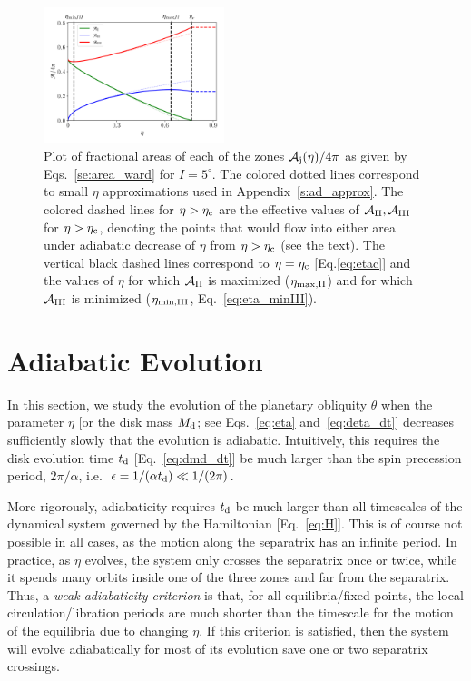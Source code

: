 \documentclass[twocolumn,twocolappendix]{aastex63}
\begin{document}
\begin{figure}
    \centering
    \includegraphics[width=0.47\textwidth]{plots_diskdisp/1_areas.png}
    \caption{Plot of fractional areas of each of the zones
    $\mathcal{A}_{\rm j}(\eta) / 4\pi$ as given by Eqs.~\eqref{se:area_ward}
    \textcolor{Corr}{for $I = 5^\circ$}. The colored dotted lines correspond to
    small $\eta$ approximations used in Appendix~\ref{s:ad_approx}. The colored
    dashed lines for $\eta > \eta_{\rm c}$ are the effective values of
    $\mathcal{A}_{\rm II}, \mathcal{A}_{\rm III}$ for $\eta > \eta_{\rm c}$,
    denoting the points that would flow into either area under adiabatic
    decrease of $\eta$ from $\eta > \eta_{\rm c}$ (see the text). The vertical
    black dashed lines correspond to $\eta = \eta_{\rm c}$ [Eq.\eqref{eq:etac}]
    and the values of $\eta$ for which $\mathcal{A}_{\rm II}$ is maximized
    ($\eta_{\rm \max, II}$) and for which $\mathcal{A}_{\rm III}$ is minimized
    ($\eta_{\rm \min, III}$, Eq.~\eqref{eq:eta_minIII}).}\label{fig:eq_areas}
\end{figure}

\section{Adiabatic Evolution}\label{s:ad}

In this section, we study the evolution of the planetary obliquity $\theta$ when
the parameter $\eta$ [or the disk mass $M_{\rm d}$; see Eqs.~\eqref{eq:eta}
and~\eqref{eq:deta_dt}] decreases sufficiently slowly that the evolution is
adiabatic. Intuitively, this requires the disk evolution time
$t_{\rm d}$ [Eq.~\eqref{eq:dmd_dt}] be much larger than the spin precession
period, $2\pi / \alpha$, i.e.\ $\epsilon = 1 / (\alpha t_{\rm d}) \ll 1/
(2\pi)$.

More rigorously, adiabaticity requires $t_{\rm d}$ be much larger than all
timescales of the dynamical system governed by the Hamiltonian
[Eq.~\eqref{eq:H}]. This is of course not possible in all cases, as the motion
along the separatrix has an infinite period. In practice, as $\eta$ evolves, the
system only crosses the separatrix once or twice, while it spends many orbits
inside one of the three zones and far from the separatrix. Thus, a \emph{weak
adiabaticity criterion} is that, for all equilibria/fixed points, the local
circulation/libration periods are much shorter than the timescale for the motion
of the equilibria due to changing $\eta$. If this criterion is satisfied, then
the system will evolve adiabatically for most of its evolution save one or two
separatrix crossings.
\end{document}
